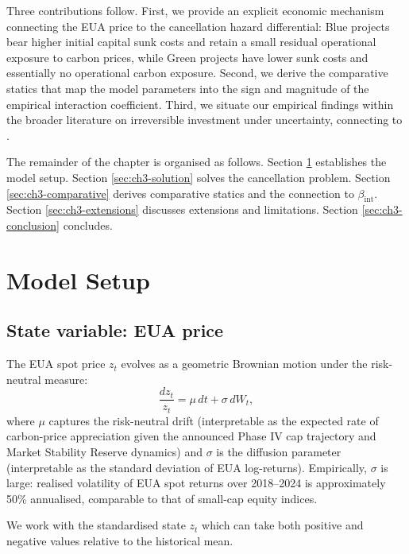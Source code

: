\documentclass[11pt,a4paper]{article}
\newcommand{\bint}{\beta_{\mathrm{int}}}
\begin{document}
Three contributions follow. First, we provide an explicit economic mechanism connecting the EUA price to the cancellation hazard differential: Blue projects bear higher initial capital sunk costs and retain a small residual operational exposure to carbon prices, while Green projects have lower sunk costs and essentially no operational carbon exposure. Second, we derive the comparative statics that map the model parameters into the sign and magnitude of the empirical interaction coefficient. Third, we situate our empirical findings within the broader literature on irreversible investment under uncertainty, connecting to \citet{pindyck1991irreversibility, dixit1994investment, bolton2021carbon, odenweller2022probabilistic}.

The remainder of the chapter is organised as follows. Section \ref{sec:ch3-setup} establishes the model setup. Section \ref{sec:ch3-solution} solves the cancellation problem. Section \ref{sec:ch3-comparative} derives comparative statics and the connection to $\bint$. Section \ref{sec:ch3-extensions} discusses extensions and limitations. Section \ref{sec:ch3-conclusion} concludes.

\section{Model Setup}
\label{sec:ch3-setup}

\subsection{State variable: EUA price}

The EUA spot price $z_t$ evolves as a geometric Brownian motion under the risk-neutral measure:
\begin{equation}
\frac{dz_t}{z_t} = \mu \, dt + \sigma \, dW_t,
\end{equation}
where $\mu$ captures the risk-neutral drift (interpretable as the expected rate of carbon-price appreciation given the announced Phase IV cap trajectory and Market Stability Reserve dynamics) and $\sigma$ is the diffusion parameter (interpretable as the standard deviation of EUA log-returns). Empirically, $\sigma$ is large: realised volatility of EUA spot returns over 2018--2024 is approximately 50\% annualised, comparable to that of small-cap equity indices.

We work with the standardised state $z_t$ which can take both positive and negative values relative to the historical mean.
\end{document}
